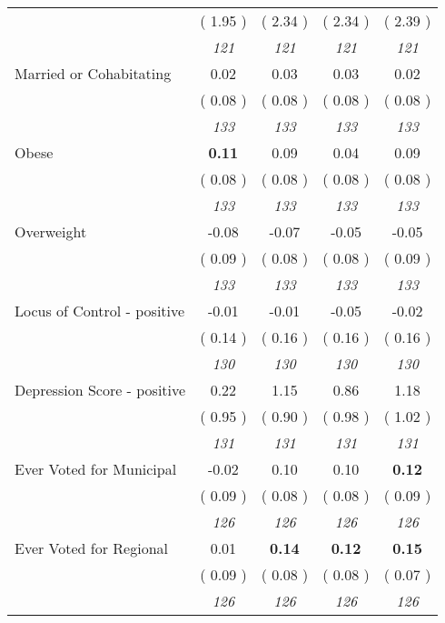 \begin{tabular}{l c c c c}
& (     1.95 ) & (     2.34 ) & (     2.34 ) & (     2.39 ) \\
& \textit{ 121 } & \textit{ 121 } & \textit{ 121 } & \textit{ 121 } \\
Married or Cohabitating &      0.02 &      0.03 &      0.03 &      0.02 \\
& (     0.08 ) & (     0.08 ) & (     0.08 ) & (     0.08 ) \\
& \textit{ 133 } & \textit{ 133 } & \textit{ 133 } & \textit{ 133 } \\
Obese & \textbf{      0.11 } &      0.09 &      0.04 &      0.09 \\
& (     0.08 ) & (     0.08 ) & (     0.08 ) & (     0.08 ) \\
& \textit{ 133 } & \textit{ 133 } & \textit{ 133 } & \textit{ 133 } \\
Overweight &     -0.08 &     -0.07 &     -0.05 &     -0.05 \\
& (     0.09 ) & (     0.08 ) & (     0.08 ) & (     0.09 ) \\
& \textit{ 133 } & \textit{ 133 } & \textit{ 133 } & \textit{ 133 } \\
Locus of Control - positive &     -0.01 &     -0.01 &     -0.05 &     -0.02 \\
& (     0.14 ) & (     0.16 ) & (     0.16 ) & (     0.16 ) \\
& \textit{ 130 } & \textit{ 130 } & \textit{ 130 } & \textit{ 130 } \\
Depression Score - positive &      0.22 &      1.15 &      0.86 &      1.18 \\
& (     0.95 ) & (     0.90 ) & (     0.98 ) & (     1.02 ) \\
& \textit{ 131 } & \textit{ 131 } & \textit{ 131 } & \textit{ 131 } \\
Ever Voted for Municipal &     -0.02 &      0.10 &      0.10 & \textbf{     0.12} \\
& (     0.09 ) & (     0.08 ) & (     0.08 ) & (     0.09 ) \\
& \textit{ 126 } & \textit{ 126 } & \textit{ 126 } & \textit{ 126 } \\
Ever Voted for Regional &      0.01 & \textbf{      0.14 } & \textbf{      0.12 } & \textbf{     0.15} \\
& (     0.09 ) & (     0.08 ) & (     0.08 ) & (     0.07 ) \\
& \textit{ 126 } & \textit{ 126 } & \textit{ 126 } & \textit{ 126 } \\
\bottomrule
\end{tabular}
